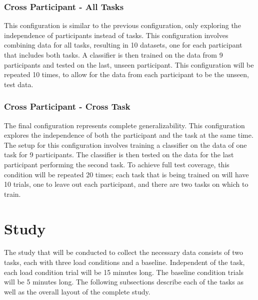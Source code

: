 \documentclass[11pt]{article}
\begin{document}
\subsubsection{Cross Participant - All Tasks}
This configuration is similar to the previous configuration, only exploring the independence of participants instead of tasks. This configuration involves combining data for all tasks, resulting in 10 datasets, one for each participant that includes both tasks. A classifier is then trained on the data from 9 participants and tested on the last, unseen participant. This configuration will be repeated 10 times, to allow for the data from each participant to be the unseen, test data.

\subsubsection{Cross Participant - Cross Task}
The final configuration represents complete generalizability. This configuration explores the independence of both the participant and the task at the same time. The setup for this configuration involves training a classifier on the data of one task for 9 participants. The classifier is then tested on the data for the last participant performing the second task. To achieve full test coverage, this condition will be repeated 20 times; each task that is being trained on will have 10 trials, one to leave out each participant, and there are two tasks on which to train.


\section{Study}
The study that will be conducted to collect the necessary data consists of two tasks, each with three load conditions and a baseline. Independent of the task, each load condition trial will be 15 minutes long. The baseline condition trials will be 5 minutes long. The following subsections describe each of the tasks as well as the overall layout of the complete study.
\end{document}
